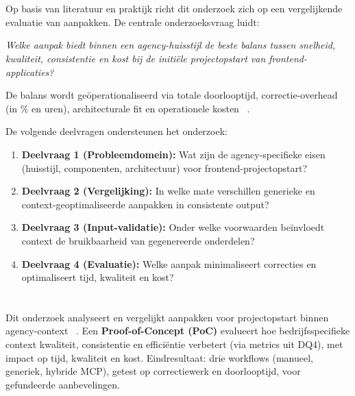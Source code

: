 \section{}
\label{sec:onderzoeksvraag}

Op basis van literatuur en praktijk richt dit onderzoek zich op een vergelijkende evaluatie van aanpakken. De centrale onderzoeksvraag luidt:

\textit{Welke aanpak biedt binnen een agency-huisstijl de beste balans tussen snelheid, kwaliteit, consistentie en kost bij de initi\"ele projectopstart van frontend-applicaties?}

De balans wordt ge\"operationaliseerd via totale doorlooptijd, correctie-overhead (in \% en uren), architecturale fit en operationele kosten~ \autocite{Augment2025}.

De volgende deelvragen ondersteunen het onderzoek:
\begin{enumerate}
\item \textbf{Deelvraag 1 (Probleemdomein):} Wat zijn de agency-specifieke eisen (huisstijl, componenten, architectuur) voor frontend-projectopstart?
\item \textbf{Deelvraag 2 (Vergelijking):} In welke mate verschillen generieke en context-geoptimaliseerde aanpakken in consistente output?
\item \textbf{Deelvraag 3 (Input-validatie):} Onder welke voorwaarden be\"invloedt context de bruikbaarheid van gegenereerde onderdelen?
\item \textbf{Deelvraag 4 (Evaluatie):} Welke aanpak minimaliseert correcties en optimaliseert tijd, kwaliteit en kost?
\end{enumerate}

\section{}
\label{sec:onderzoeksdoelstelling}

Dit onderzoek analyseert en vergelijkt aanpakken voor projectopstart binnen agency-context~ \autocite{Fang2024}. Een \textbf{Proof-of-Concept (PoC)} evalueert hoe bedrijfsspecifieke context kwaliteit, consistentie en effici\"entie verbetert (via metrics uit DQ4), met impact op tijd, kwaliteit en kost. Eindresultaat: drie workflows (manueel, generiek, hybride MCP), getest op correctiewerk en doorlooptijd, voor gefundeerde aanbevelingen.

